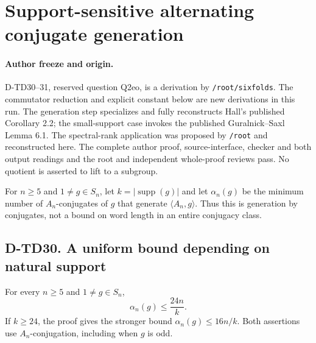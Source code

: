 \section{Support-sensitive alternating conjugate generation}
\label{sec:SF-support-conjugate-generation}

\paragraph{Author freeze and origin.}
D-TD30--31, reserved question Q2eo, is a derivation by
\texttt{/root/sixfolds}. The commutator reduction and explicit constant
below are new derivations in this run. The generation step specializes
and fully reconstructs Hall's published Corollary 2.2; the small-support
case invokes the published Guralnick--Saxl Lemma 6.1. The spectral-rank
application was proposed by \texttt{/root} and reconstructed here.
The complete author proof, source-interface, checker and both output
readings and the root and independent whole-proof reviews pass.
No quotient is asserted to lift to a subgroup.

For $n\ge5$ and $1\ne g\in S_n$, let $k=|\operatorname{supp}(g)|$ and
let $\alpha_n(g)$ be the minimum number of $A_n$-conjugates of $g$
that generate $\langle A_n,g\rangle$. Thus this is generation by
conjugates, not a bound on word length in an entire conjugacy class.

\subsection*{D-TD30. A uniform bound depending on natural support}

\begin{theorem}[D-TD30]
For every $n\ge5$ and $1\ne g\in S_n$,
\[
                  \alpha_n(g)\le\frac{24n}{k}.
                  \tag{SCG.1}
\]
If $k\ge24$, the proof gives the stronger bound
$\alpha_n(g)\le16n/k$. Both assertions use $A_n$-conjugation,
including when $g$ is odd.
\end{theorem}

